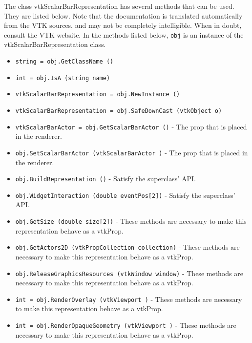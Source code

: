 The class vtkScalarBarRepresentation has several methods that can be used.
  They are listed below.
Note that the documentation is translated automatically from the VTK sources,
and may not be completely intelligible.  When in doubt, consult the VTK website.
In the methods listed below, \verb|obj| is an instance of the vtkScalarBarRepresentation class.
\begin{itemize}
\item  \verb|string = obj.GetClassName ()|

\item  \verb|int = obj.IsA (string name)|

\item  \verb|vtkScalarBarRepresentation = obj.NewInstance ()|

\item  \verb|vtkScalarBarRepresentation = obj.SafeDownCast (vtkObject o)|

\item  \verb|vtkScalarBarActor = obj.GetScalarBarActor ()| -  The prop that is placed in the renderer.

\item  \verb|obj.SetScalarBarActor (vtkScalarBarActor )| -  The prop that is placed in the renderer.

\item  \verb|obj.BuildRepresentation ()| -  Satisfy the superclass' API.

\item  \verb|obj.WidgetInteraction (double eventPos[2])| -  Satisfy the superclass' API.

\item  \verb|obj.GetSize (double size[2])| -  These methods are necessary to make this representation behave as
 a vtkProp.

\item  \verb|obj.GetActors2D (vtkPropCollection collection)| -  These methods are necessary to make this representation behave as
 a vtkProp.

\item  \verb|obj.ReleaseGraphicsResources (vtkWindow window)| -  These methods are necessary to make this representation behave as
 a vtkProp.

\item  \verb|int = obj.RenderOverlay (vtkViewport )| -  These methods are necessary to make this representation behave as
 a vtkProp.

\item  \verb|int = obj.RenderOpaqueGeometry (vtkViewport )| -  These methods are necessary to make this representation behave as
 a vtkProp.


\end{itemize}
